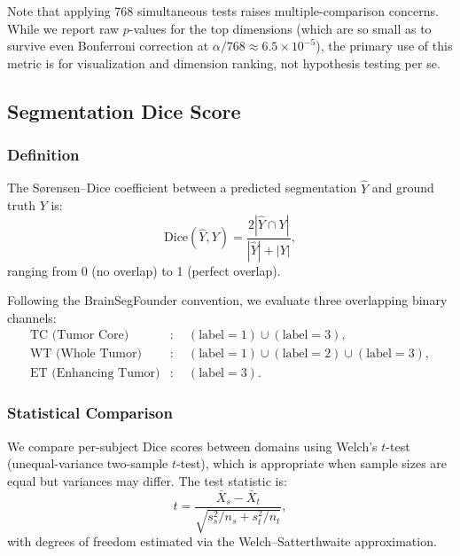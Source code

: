 \documentclass[11pt,a4paper]{article}
\theoremstyle{definition}
\begin{document}
Note that applying 768 simultaneous tests raises multiple-comparison concerns. While we report raw $p$-values for the top dimensions (which are so small as to survive even Bonferroni correction at $\alpha / 768 \approx 6.5 \times 10^{-5}$), the primary use of this metric is for visualization and dimension ranking, not hypothesis testing per se.


\subsection{Segmentation Dice Score}\label{sec:dice}

\subsubsection{Definition}

The S{\o}rensen--Dice coefficient \cite{dice1945} between a predicted segmentation $\hat{Y}$ and ground truth $Y$ is:
\begin{equation}\label{eq:dice}
  \text{Dice}(\hat{Y}, Y) = \frac{2 |\hat{Y} \cap Y|}{|\hat{Y}| + |Y|},
\end{equation}
ranging from 0 (no overlap) to 1 (perfect overlap).

Following the BrainSegFounder convention, we evaluate three overlapping binary channels:
\begin{align}
  \text{TC (Tumor Core)} &: \quad (\text{label} = 1) \cup (\text{label} = 3), \\
  \text{WT (Whole Tumor)} &: \quad (\text{label} = 1) \cup (\text{label} = 2) \cup (\text{label} = 3), \\
  \text{ET (Enhancing Tumor)} &: \quad (\text{label} = 3).
\end{align}

\subsubsection{Statistical Comparison}

We compare per-subject Dice scores between domains using Welch's $t$-test (unequal-variance two-sample $t$-test), which is appropriate when sample sizes are equal but variances may differ. The test statistic is:
\begin{equation}\label{eq:welch}
  t = \frac{\bar{X}_s - \bar{X}_t}{\sqrt{s_s^2/n_s + s_t^2/n_t}},
\end{equation}
with degrees of freedom estimated via the Welch--Satterthwaite approximation.
\end{document}
